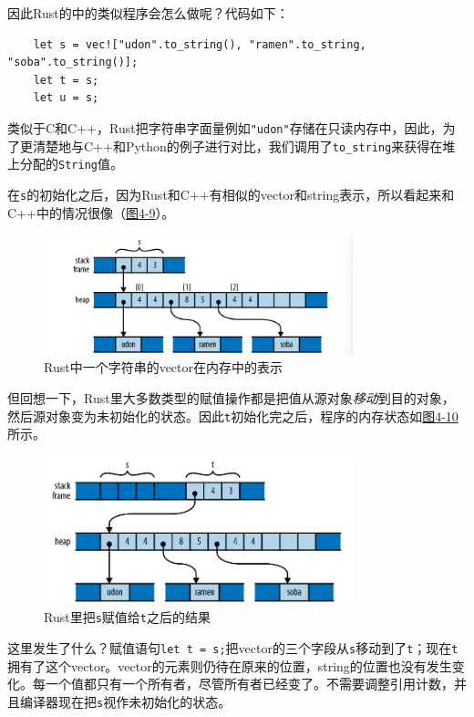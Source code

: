 因此Rust的中的类似程序会怎么做呢？代码如下：
\begin{verbatim}
    let s = vec!["udon".to_string(), "ramen".to_string, "soba".to_string()];
    let t = s;
    let u = s;
\end{verbatim}

类似于C和C++，Rust把字符串字面量例如\texttt{"udon"}存储在只读内存中，因此，为了更清楚地与C++和Python的例子进行对比，我们调用了\texttt{to\_string}来获得在堆上分配的\texttt{String}值。

在\texttt{s}的初始化之后，因为Rust和C++有相似的vector和string表示，所以看起来和C++中的情况很像（\hyperref[f4-9]{图4-9}）。

\begin{figure}[htbp]
    \centering
    \includegraphics[width=0.8\textwidth]{../img/f4-9.png}
    \caption{Rust中一个字符串的vector在内存中的表示}
    \label{f4-9}
\end{figure}

但回想一下，Rust里大多数类型的赋值操作都是把值从源对象\emph{移动}到目的对象，然后源对象变为未初始化的状态。因此\texttt{t}初始化完之后，程序的内存状态如\hyperref[f4-10]{图4-10}所示。

\begin{figure}[htbp]
    \centering
    \includegraphics[width=0.8\textwidth]{../img/f4-10.png}
    \caption{Rust里把\texttt{s}赋值给\texttt{t}之后的结果}
    \label{f4-10}
\end{figure}

这里发生了什么？赋值语句\texttt{let t = s;}把vector的三个字段从\texttt{s}移动到了\texttt{t}；现在\texttt{t}拥有了这个vector。vector的元素则仍待在原来的位置，string的位置也没有发生变化。每一个值都只有一个所有者，尽管所有者已经变了。不需要调整引用计数，并且编译器现在把\texttt{s}视作未初始化的状态。

